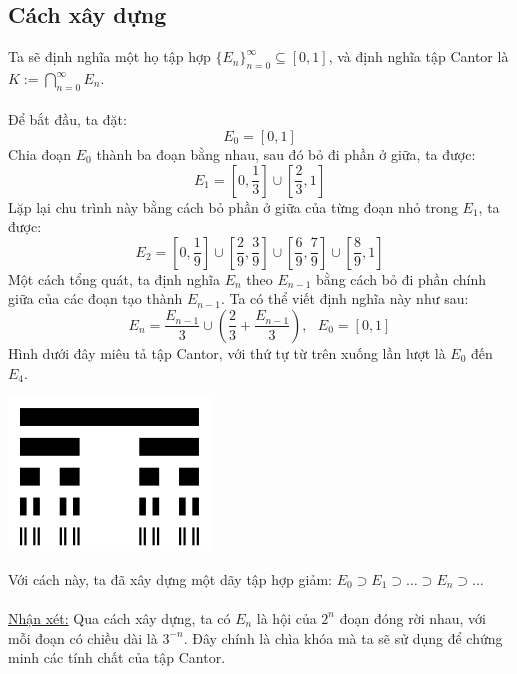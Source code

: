 \documentclass[10.5pt, a4paper]{article}
\begin{document}
\subsection{Cách xây dựng}
\vspace{1mm}
Ta sẽ định nghĩa một họ tập hợp $\{E_n\}_{n=0}^\infty\subseteq[0,1]$, và định nghĩa tập Cantor là $K:=\displaystyle\bigcap_{n=0}^\infty E_n$.\\\\
Để bắt đầu, ta đặt: $$E_0=[0,1]$$
Chia đoạn $E_0$ thành ba đoạn bằng nhau, sau đó bỏ đi phần ở giữa, ta được: $$E_1=\left[0,\dfrac13\right]\cup\left[\dfrac23,1\right]$$
Lặp lại chu trình này bằng cách bỏ phần ở giữa của từng đoạn nhỏ trong $E_1$, ta được: $$E_2=\left[0,\dfrac19\right]\cup\left[\dfrac29,\dfrac39\right]\cup\left[\dfrac69,\dfrac79\right]\cup\left[\dfrac89,1\right]$$
Một cách tổng quát, ta định nghĩa $E_n$ theo $E_{n-1}$ bằng cách bỏ đi phần chính giữa của các đoạn tạo thành $E_{n-1}$. Ta có thể viết định nghĩa này như sau: $$E_n=\dfrac{E_{n-1}}{3}\cup\left(\dfrac23+\dfrac{E_{n-1}}{3}\right),~~~E_0=[0,1]$$
Hình dưới đây miêu tả tập Cantor, với thứ tự từ trên xuống lần lượt là $E_0$ đến $E_4$.
\begin{center}
    \includegraphics[width=0.4\linewidth]{cantor.png}
\end{center}
Với cách này, ta đã xây dựng một dãy tập hợp giảm: $E_0\supset E_1\supset\ldots\supset E_n\supset\ldots$\\\\
\underline{Nhận xét:} Qua cách xây dựng, ta có $E_n$ là hội của $2^n$ đoạn đóng rời nhau, với mỗi đoạn có chiều dài là $3^{-n}$. Đây chính là chìa khóa mà ta sẽ sử dụng để chứng minh các tính chất của tập Cantor.
\end{document}
